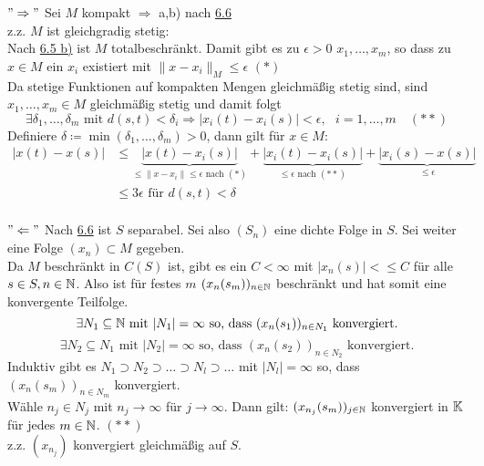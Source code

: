 \begin{beweis}
	$"\Rightarrow"$ Sei $M$ kompakt $\Rightarrow$ a,b) nach \hyperref[prop:6.6]{6.6} \\
	z.z. $M$ ist gleichgradig stetig: \\
	Nach \hyperref[satz:6.5b]{6.5 b)} ist $M$ totalbeschränkt. Damit gibt es zu $\epsilon > 0$ $x_{1}, \dotsc, x_{m}$, so dass zu $x \in M$ ein $x_{i}$ existiert mit $\| x - x_{i} \|_{M} \leq \epsilon$ $(*)$ \\
	Da stetige Funktionen auf kompakten Mengen gleichmä{\ss}ig stetig sind, sind$x_{1}, \dotsc, x_{m} \in M$ gleichmä{\ss}ig stetig und damit folgt 
	\[ \exists \delta_{1}, \dotsc, \delta_{m} \text{ mit } d(s, t) < \delta_{i} \Rightarrow |x_{i}(t) - x_{i}(s)| < \epsilon, \text{ } i = 1, \dotsc, m \quad (**) \]
	Definiere $\delta \coloneqq \min(\delta_{1}, \dotsc, \delta_{m}) > 0$, dann gilt für $x \in M$:
	\begin{align*}
		| x(t) - x(s) | & \leq \underbrace{| x(t) - x_{i}(s) |}_{\leq \| x - x_{i} \| \leq \epsilon \text{ nach } (*) } + \underbrace{| x_{i}(t) - x_{i}(s) |}_{\leq \epsilon \text{ nach } (**) } + \underbrace{| x_{i}(s) - x(s) |}_{\leq \epsilon} \\
						& \leq 3 \epsilon \text{ für } d(s, t) < \delta 
	\end{align*} \\
	$"\Leftarrow"$ Nach \hyperref[prop:6.6]{6.6} ist $S$ separabel. Sei also $(S_{n})$ eine dichte Folge in $S$. Sei weiter eine Folge $(x_{n}) \subset M$ gegeben. \\
	Da $M$ beschränkt in $C(S)$ ist, gibt es ein $C < \infty$ mit $| x_{n}(s) | <\leq C$ für alle $s \in S, n \in \mathbb{N}$. Also ist für festes $m$ $(x_{n}(s_{m}))_{n \in \mathbb{N}}$ beschränkt und hat somit eine konvergente Teilfolge. \\
	\[ \exists N_{1} \subseteq \mathbb{N} \text{ mit } |N_{1}| = \infty \text{ so, dass } (x_{n}(s_{1}))_{n \in N_{1}} \text{ konvergiert.}  \]
	\[ \exists N_{2} \subseteq N_{1} \text{ mit } |N_{2}| = \infty \text{ so, dass } (x_{n}(s_{2}))_{n \in N_{2}} \text{ konvergiert.}  \]	
	Induktiv gibt es $N_{1} \supset N_{2} \supset \dotsc \supset N_{l} \supset \dotsc$ mit $|N_{l}| = \infty$ so, dass $(x_{n}(s_{m}))_{n \in N_{m}}$ konvergiert. \\
	Wähle $n_{j} \in N_{j}$ mit $n_{j} \rightarrow \infty$ für $j \rightarrow \infty$. Dann gilt: $(x_{n_{j}}(s_{m}))_{j \in \mathbb{N}}$ konvergiert in $\mathbb{K}$ für jedes $m \in \mathbb{N}$. $(**)$ \\
	z.z. $(x_{n_{j}})$ konvergiert gleichmä{\ss}ig auf $S$. \\

\end{beweis}

